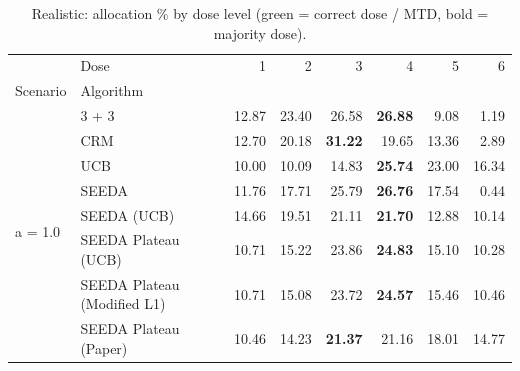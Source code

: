\begin{table}[H]
\centering
\caption{Realistic: allocation \% by dose level (green = correct dose / MTD, bold = majority dose).}
\label{tab:real_alloc_by_dose}
\begin{tabular}{llrrrrrr}
\toprule
 & Dose & 1 & 2 & 3 & 4 & 5 & 6 \\
Scenario & Algorithm &  &  &  &  &  &  \\
\midrule
\multirow[c]{8}{*}{a = 1.0} & 3 + 3 & 12.87 & 23.40 & {\cellcolor[HTML]{C8E6C9}} 26.58 & \bfseries 26.88 & 9.08 & 1.19 \\
 & CRM & 12.70 & 20.18 & {\cellcolor[HTML]{C8E6C9}} \bfseries 31.22 & 19.65 & 13.36 & 2.89 \\
 & UCB & 10.00 & 10.09 & {\cellcolor[HTML]{C8E6C9}} 14.83 & \bfseries 25.74 & 23.00 & 16.34 \\
 & SEEDA & 11.76 & 17.71 & {\cellcolor[HTML]{C8E6C9}} 25.79 & \bfseries 26.76 & 17.54 & 0.44 \\
 & SEEDA (UCB) & 14.66 & 19.51 & {\cellcolor[HTML]{C8E6C9}} 21.11 & \bfseries 21.70 & 12.88 & 10.14 \\
 & SEEDA Plateau (UCB) & 10.71 & 15.22 & {\cellcolor[HTML]{C8E6C9}} 23.86 & \bfseries 24.83 & 15.10 & 10.28 \\
 & SEEDA Plateau (Modified L1) & 10.71 & 15.08 & {\cellcolor[HTML]{C8E6C9}} 23.72 & \bfseries 24.57 & 15.46 & 10.46 \\
 & SEEDA Plateau (Paper) & 10.46 & 14.23 & {\cellcolor[HTML]{C8E6C9}} \bfseries 21.37 & 21.16 & 18.01 & 14.77 \\
\bottomrule
\end{tabular}
\end{table}
